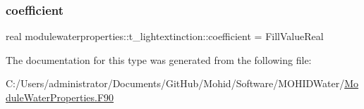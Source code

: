 \subsubsection{\texorpdfstring{coefficient}{coefficient}}
{\footnotesize\ttfamily real modulewaterproperties\+::t\+\_\+lightextinction\+::coefficient = Fill\+Value\+Real\hspace{0.3cm}{\ttfamily [private]}}



The documentation for this type was generated from the following file\+:\begin{DoxyCompactItemize}
\item 
C\+:/\+Users/administrator/\+Documents/\+Git\+Hub/\+Mohid/\+Software/\+M\+O\+H\+I\+D\+Water/\mbox{\hyperlink{_module_water_properties_8_f90}{Module\+Water\+Properties.\+F90}}\end{DoxyCompactItemize}
